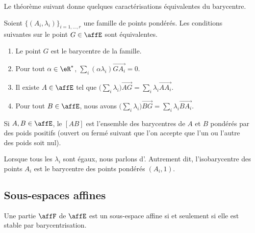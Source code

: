 Le théorème suivant donne quelques caractérisations équivalentes du barycentre.
\begin{theorem}      \label{ThoIJVzxr}
	Soient \( \{ (A_i,\lambda_i) \}_{i=1,\ldots, r}\) une famille de points pondérés. Les conditions suivantes sur le point \( G\in \affE\) sont équivalentes.
	\begin{enumerate}
		\item
		      Le point \( G\) est le barycentre de la famille.
		\item
		      Pour tout \( \alpha\in \eR^*\), \( \sum_i(\alpha\lambda_i)\overrightarrow{ GA_i }=0\).
		\item
		      Il existe \( A\in\affE\) tel que \( \big( \sum_i\lambda_i \big)\overrightarrow{ AG }=\sum_i\lambda_i\overrightarrow{ AA_i }\).
		\item   \label{ItemEgOQBX}
		      Pour tout \( B\in\affE\), nous avons \( \big( \sum_i\lambda_i \big)\overrightarrow{ BG }=\sum_i\lambda_i\overrightarrow{ BA_i }\).
	\end{enumerate}
\end{theorem}

\begin{definition}
	Si \( A,B\in \affE\), le  \( [AB]\) est l'ensemble des barycentres de \( A\) et \( B\) pondérés par des poids positifs (ouvert ou fermé suivant que l'on accepte que l'un ou l'autre des poids soit nul).
\end{definition}

Lorsque tous les \( \lambda_i\) sont égaux, nous parlons d'. Autrement dit, l'isobarycentre des points \( A_i\) est le barycentre des points pondérés \( (A_i,1)\).

\subsection{Sous-espaces affines}

\begin{proposition}
	Une partie \( \affF\) de \( \affE\) est un sous-espace affine si et seulement si elle est stable par barycentrisation.
\end{proposition}

